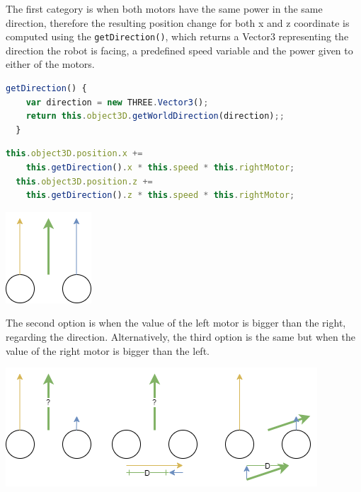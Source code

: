 \documentclass{scrbook}
\begin{document}
The first category is when both motors have the same power in the same direction, therefore the resulting position change for both x and z coordinate is computed using the \texttt{getDirection()}, which returns 
a Vector3 representing the direction the robot is facing, a predefined speed variable and the power given to either of the motors.

\begin{lstlisting}[language=JavaScript, gobble=2, basicstyle=\ttfamily\small]
  getDirection() {
    var direction = new THREE.Vector3();
    return this.object3D.getWorldDirection(direction);;
  }
\end{lstlisting} 

\begin{lstlisting}[language=JavaScript, gobble=2, basicstyle=\ttfamily\small]
  this.object3D.position.x += 
    this.getDirection().x * this.speed * this.rightMotor;
  this.object3D.position.z +=
    this.getDirection().z * this.speed * this.rightMotor;
\end{lstlisting}  

\begin{center}
  \includegraphics[scale=0.8]{./move_spsd}
\end{center}

The second option is when the value of the left motor is bigger than the right, regarding the direction. Alternatively, the third option is the same but when the value of the right motor is bigger than the left.

\begin{center}
  \includegraphics[width=\textwidth]{./move_dp}
\end{center}
\end{document}

